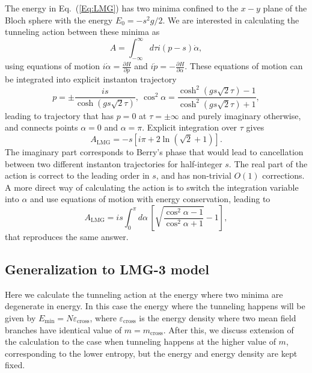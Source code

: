 \documentclass[aps,prx,showpacs,amsmath,amssymb,superscriptaddress,twocolumn,longbibliography,10pt,nofootinbib]{revtex4-2}
\renewcommand{\phi}{\alpha} %
\begin{document}
The energy in Eq.~(\ref{Eq:LMG}) has two minima confined to the $x-y$ plane of the Bloch sphere with the energy $E_0 = -s^2 g/2$. We are interested in calculating the tunneling action between these minima as 
\begin{equation}\label{Eq:A}
A = \int_{-\infty}^\infty d\tau  i (p-s) \dot \phi,
\end{equation}
using equations of motion $i\dot \phi = \frac{\partial H}{\partial p}$ and $i\dot p = -\frac{\partial H}{\partial \phi}$. These equations of motion can be integrated into explicit instanton trajectory 
 \begin{equation}
 p  = \pm \frac{i s}{\cosh (gs\sqrt{2} \tau)},
 \
 \cos^2 \phi= \frac{\cosh^2 (gs\sqrt{2} \tau)-1}{\cosh^2 (gs\sqrt{2} \tau)+1},
 \end{equation}
leading to trajectory that has $p=0$ at $\tau = \pm \infty$ and purely imaginary otherwise, and connects points $\phi=0$ and $\phi=\pi$. Explicit integration over $\tau$ gives
\begin{equation}\label{Eq:A-LMG2}
A_\text{LMG} = -s [i\pi + 2 \ln(\sqrt2+1)].
\end{equation}
The imaginary part corresponds to Berry's phase that would lead to cancellation between two different instanton trajectories for half-integer $s$. The real part of the action is correct to the leading order in $s$, and has non-trivial $O(1)$ corrections. A more direct way of calculating the action is to switch the integration variable into $\phi$ and use equations of motion with energy conservation, leading to 
\begin{equation}
    A_\text{LMG} = is \int_0^\pi d\phi\, [\sqrt{\frac{\cos^2\phi-1}{\cos^2\phi+1}}-1],
\end{equation}
that reproduces the same answer. 
\subsection{Generalization to LMG-3 model}
Here we calculate the tunneling action at the energy where two minima are degenerate in energy. In this case the energy where the tunneling happens will be given by $E_\text{min} = N\varepsilon_\text{cross}$, where $\varepsilon_\text{cross}$ is the energy density where two mean field branches have identical value of $m=m_\text{cross}$. After this, we discuss extension of the calculation to the case when tunneling happens at the higher value of $m$, corresponding to the lower entropy, but the energy and energy density are kept fixed.
\end{document}
